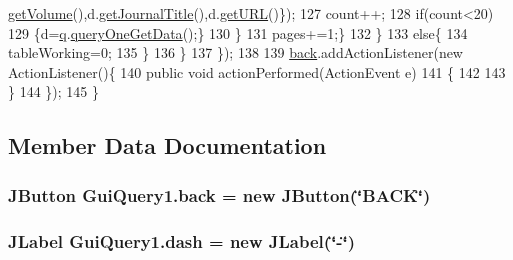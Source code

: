 \begin{DoxyCode}
      \hyperlink{classDataRecords_a6dfac293f0bd901eebf3a6ae17dc2513}{getVolume}(),d.\hyperlink{classDataRecords_add5c32b5a1511c42f70846fe08a4cfd7}{getJournalTitle}(),d.\hyperlink{classDataRecords_a40351f370945cfa624e1e3e1d6addc3e}{getURL}()\});
127                             count++;
128                             \textcolor{keywordflow}{if}(count<20)
129                             \{d=\hyperlink{classGUIQuery_a2a20445d749185552014142b78f3e071}{q}.\hyperlink{classQueryFacade_adf9324b3f38765b2b6c1b4a64b301a11}{queryOneGetData}();\}    
130                         \}
131                         pages+=1;\}
132                 \}
133                 \textcolor{keywordflow}{else}\{
134                     tableWorking=0;
135                 \}
136             \}
137         \});
138 
139         \hyperlink{classGuiQuery1_a2b884d6a7f21de2efe0640e21fe6aadd}{back}.addActionListener(\textcolor{keyword}{new} ActionListener()\{
140             \textcolor{keyword}{public} \textcolor{keywordtype}{void} actionPerformed(ActionEvent e)
141             \{
142 
143             \}
144         \});
145     \}   
\end{DoxyCode}


\subsection{Member Data Documentation}
\subsubsection[{\texorpdfstring{back}{back}}]{\setlength{\rightskip}{0pt plus 5cm}J\+Button Gui\+Query1.\+back = new J\+Button(\char`\"{}B\+A\+CK\char`\"{})\hspace{0.3cm}{\ttfamily [protected]}}\hypertarget{classGuiQuery1_a2b884d6a7f21de2efe0640e21fe6aadd}{}\label{classGuiQuery1_a2b884d6a7f21de2efe0640e21fe6aadd}
\subsubsection[{\texorpdfstring{dash}{dash}}]{\setlength{\rightskip}{0pt plus 5cm}J\+Label Gui\+Query1.\+dash = new J\+Label(\char`\"{}-\/\char`\"{})\hspace{0.3cm}{\ttfamily [protected]}}\hypertarget{classGuiQuery1_a40b4913205157f6e39c46956654a11f2}{}\label{classGuiQuery1_a40b4913205157f6e39c46956654a11f2}
